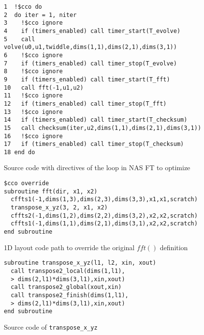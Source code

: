 \begin{figure}[h]
{\scriptsize
\begin{verbatim}
1  !$cco do
2  do iter = 1, niter
3    !$cco ignore
4    if (timers_enabled) call timer_start(T_evolve)
5    call volve(u0,u1,twiddle,dims(1,1),dims(2,1),dims(3,1))
6    !$cco ignore
7    if (timers_enabled) call timer_stop(T_evolve)
8    !$cco ignore
9    if (timers_enabled) call timer_start(T_fft)
10   call fft(-1,u1,u2)
11   !$cco ignore
12   if (timers_enabled) call timer_stop(T_fft)
13   !$cco ignore
14   if (timers_enabled) call timer_start(T_checksum)
15   call checksum(iter,u2,dims(1,1),dims(2,1),dims(3,1))
16   !$cco ignore
17   if (timers_enabled) call timer_stop(T_checksum)
18 end do
\end{verbatim}
}%
\caption{Source code with directives of the loop in NAS FT to optimize}
\label{fig:code:ft}
\end{figure}

%
%
%
%
\begin{figure}[h]
{\scriptsize
\begin{verbatim}
$cco override
subroutine fft(dir, x1, x2)
  cffts1(-1,dims(1,3),dims(2,3),dims(3,3),x1,x1,scratch)
  transpose_x_yz(3, 2, x1, x2)
  cffts2(-1,dims(1,2),dims(2,2),dims(3,2),x2,x2,scratch)
  cffts1(-1,dims(1,1),dims(2,1),dims(3,1),x2,x2,scratch)
end subroutine
\end{verbatim}
}%
\caption{1D layout code path to override the original $fft()$ definition}
\label{fig:annot:ft}
\end{figure}

\begin{figure}[h]
{\scriptsize
\begin{verbatim}
subroutine transpose_x_yz(l1, l2, xin, xout)
  call transpose2_local(dims(1,l1),
  > dims(2,l1)*dims(3,l1),xin,xout)
  call transpose2_global(xout,xin)
  call transpose2_finish(dims(1,l1),
  > dims(2,l1)*dims(3,l1),xin,xout)
end subroutine
\end{verbatim}
}%
\caption{Source code of \texttt{transpose\_x\_yz}}
\label{fig:code:transpose}
\end{figure}

